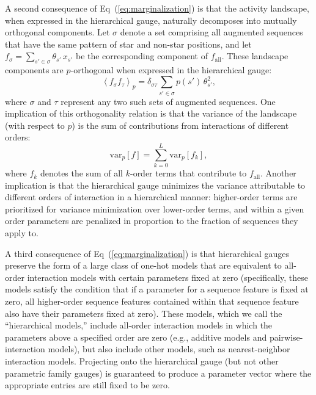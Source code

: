 \documentclass[10pt,letterpaper]{article}
\newcommand{\eq}[1]{Eq\ (\ref{#1})}
\newcommand{\braket}[1]{\left\langle #1 \right\rangle}
\newcommand{\myvar}{\mathrm{var}}
\begin{document}
A second consequence of \eq{eq:marginalization} is that the activity landscape, when expressed in the hierarchical gauge, naturally decomposes into mutually orthogonal components. Let $\sigma$ denote a set comprising all augmented sequences that have the same pattern of star and non-star positions, and let $f_\sigma = \sum_{s' \in \sigma} \theta_{s'}\, x_{s'}$ be the corresponding component of $f_\mathrm{all}$. These landscape components are $p$-orthogonal when expressed in the hierarchical gauge: 
\begin{equation}
\braket{f_\sigma f_\tau}_p = \delta_{\sigma \tau}  \sum_{s' \in \sigma} p(s')\, \theta_{s'}^2, \label{eq:component_orthogonality}
\end{equation}
where $\sigma$ and $\tau$ represent any two such sets of augmented sequences. One implication of this orthogonality relation is that the variance of the landscape (with respect to $p$) is the sum of contributions from interactions of different orders:
\begin{equation}
    \myvar_p [f] = \sum_{k=0}^L \myvar_p[f_k],
\end{equation}
where $f_k$ denotes the sum of all $k$-order terms that contribute to $f_\mathrm{all}$. Another implication is that the hierarchical gauge minimizes the variance attributable to different orders of interaction in a hierarchical manner: higher-order terms are prioritized for variance minimization over lower-order terms, and within a given order parameters are penalized in proportion to the fraction of sequences they apply to.

A third consequence of \eq{eq:marginalization} is that hierarchical gauges preserve the form of a large class of one-hot models that are equivalent to all-order interaction models with certain parameters fixed at zero (specifically, these models satisfy the condition that if a parameter for a sequence feature is fixed at zero, all higher-order sequence features contained within that sequence feature also have their parameters fixed at zero). These models, which we call the ``hierarchical models,'' include all-order interaction models in which the parameters above a specified order are zero (e.g., additive models and pairwise-interaction models), but also include other models, such as nearest-neighbor interaction models. Projecting onto the hierarchical gauge (but not other parametric family gauges) is guaranteed to produce a parameter vector where the appropriate entries are still fixed to be zero. 

\end{document}
